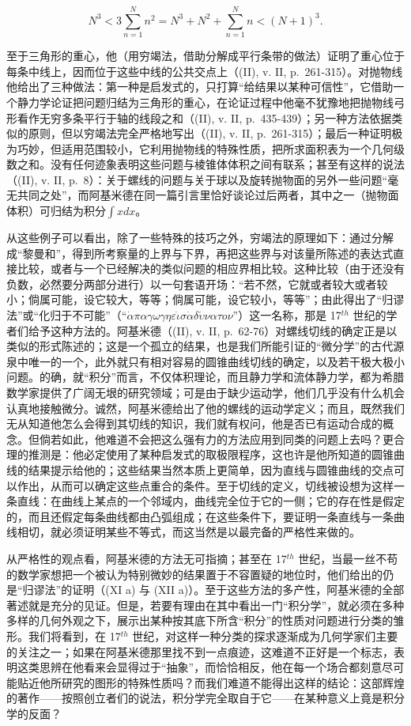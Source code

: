 \[
N ^ {3} <   3 \sum_ {n = 1} ^ {N} n ^ {2} = N ^ {3} + N ^ {2} + \sum_ {n = 1} ^ {N} n <   (N + 1) ^ {3}.
\]

至于三角形的重心，他（用穷竭法，借助分解成平行条带的做法）证明了重心位于每条中线上，因而位于这些中线的公共交点上（(II), v. II, p.~261-315）。对抛物线他给出了三种做法：第一种是启发式的，只打算“给结果以某种可信性”，它借助一个静力学论证把问题归结为三角形的重心，在论证过程中他毫不犹豫地把抛物线弓形看作无穷多条平行于轴的线段之和（(II), v. II, p.~435-439）；另一种方法依据类似的原则，但以穷竭法完全严格地写出（(II), v. II, p.~261-315）；最后一种证明极为巧妙，但适用范围较小，它利用抛物线的特殊性质，把所求面积表为一个几何级数之和。没有任何迹象表明这些问题与棱锥体体积之间有联系；甚至有这样的说法（(II), v. II, p.~8）：关于螺线的问题与关于球以及旋转抛物面的另外一些问题“毫无共同之处”，而阿基米德在同一篇引言里恰好谈论过后两者，其中之一（抛物面体积）可归结为积分\(\int x dx\)。

从这些例子可以看出，除了一些特殊的技巧之外，穷竭法的原理如下：通过分解成“黎曼和”，得到所考察量的上界与下界，再把这些界与对该量所陈述的表达式直接比较，或者与一个已经解决的类似问题的相应界相比较。这种比较（由于还没有负数，必然要分两部分进行）以一句套语开场：“若不然，它就或者较大或者较小；倘属可能，设它较大，等等；倘属可能，设它较小，等等”；由此得出了“归谬法”或“化归于不可能”（“\(\dot{\alpha}\pi\alpha\gamma\omega\gamma\eta \varepsilon\dot{\iota}\sigma \dot{\alpha}\delta\acute{\upsilon}\nu\alpha\tau o\nu\)”）这一名称，那是 17\(^{th}\) 世纪的学者们给予这种方法的。阿基米德（(II), v. II, p.~62-76）对螺线切线的确定正是以类似的形式陈述的；这是一个孤立的结果，也是我们所能引证的“微分学”的古代源泉中唯一的一个，此外就只有相对容易的圆锥曲线切线的确定，以及若干极大极小问题。的确，就“积分”而言，不仅体积理论，而且静力学和流体静力学，都为希腊数学家提供了广阔无垠的研究领域；可是由于缺少运动学，他们几乎没有什么机会认真地接触微分。诚然，阿基米德给出了他的螺线的运动学定义；而且，既然我们无从知道他怎么会得到其切线的知识，我们就有权问，他是否已有运动合成的概念。但倘若如此，他难道不会把这么强有力的方法应用到同类的问题上去吗？更合理的推测是：他必定使用了某种启发式的取极限程序，这也许是他所知道的圆锥曲线的结果提示给他的；这些结果当然本质上更简单，因为直线与圆锥曲线的交点可以作出，从而可以确定这些点重合的条件。至于切线的定义，切线被设想为这样一条直线：在曲线上某点的一个邻域内，曲线完全位于它的一侧；它的存在性是假定的，而且还假定每条曲线都由凸弧组成；在这些条件下，要证明一条直线与一条曲线相切，就必须证明某些不等式，而这当然是以最完备的严格性来做的。

从严格性的观点看，阿基米德的方法无可指摘；甚至在 17\(^{th}\) 世纪，当最一丝不苟的数学家想把一个被认为特别微妙的结果置于不容置疑的地位时，他们给出的仍是“归谬法”的证明（(XI a) 与 (XII a)）。至于这些方法的多产性，阿基米德的全部著述就是充分的见证。但是，若要有理由在其中看出一门“积分学”，就必须在多种多样的几何外观之下，展示出某种按其底下所含“积分”的性质对问题进行分类的雏形。我们将看到，在 17\(^{th}\) 世纪，对这样一种分类的探求逐渐成为几何学家们主要的关注之一；如果在阿基米德那里找不到一点痕迹，这难道不正好是一个标志，表明这类思辨在他看来会显得过于“抽象”，而恰恰相反，他在每一个场合都刻意尽可能贴近他所研究的图形的特殊性质吗？而我们难道不能得出这样的结论：这部辉煌的著作——按照创立者们的说法，积分学完全取自于它——在某种意义上竟是积分学的反面？

